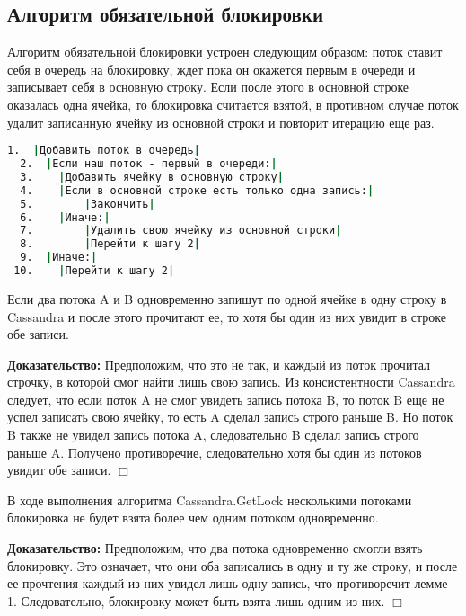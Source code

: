 \subsection{Алгоритм обязательной блокировки}

Алгоритм обязательной блокировки устроен следующим образом: поток ставит себя в очередь на блокировку, ждет пока он окажется первым в очереди и записывает себя в основную строку. Если после этого в основной строке оказалась одна ячейка, то блокировка считается взятой, в противном случае поток удалит записанную ячейку из основной строки и повторит итерацию еще раз.

\begin{lstlisting}[language=csh,caption={Алгоритм Cassandra.GetLock(lockId, threadId)}]
  1.  |Добавить поток в очередь|
  2.  |Если наш поток - первый в очереди:|
  3.  	|Добавить ячейку в основную строку|
  4.  	|Если в основной строке есть только одна запись:|
  5.  		|Закончить|
  6.  	|Иначе:|
  7.  		|Удалить свою ячейку из основной строки|
  8.  		|Перейти к шагу 2|
  9.  |Иначе:|
 10.  	|Перейти к шагу 2|

\end{lstlisting}

\begin{lemma}
Если два потока A и B одновременно запишут по одной ячейке в одну строку в Cassandra и после этого прочитают ее, то хотя бы один из них увидит в строке обе записи.
\end{lemma}
\textbf{Доказательство:}
Предположим, что это не так, и каждый из поток прочитал строчку, в которой смог найти лишь свою запись. Из консистентности Cassandra следует, что если поток A не смог увидеть запись потока B, то поток B еще не успел записать свою ячейку, то есть A сделал запись строго раньше B. Но поток B также не увидел запись потока A, следовательно B сделал запись строго раньше A. Получено противоречие, следовательно хотя бы один из потоков увидит обе записи.
$\Box$

\begin{theorem}
В ходе выполнения алгоритма Cassandra.GetLock несколькими потоками блокировка не будет взята более чем одним потоком одновременно.
\end{theorem}
\textbf{Доказательство:}
Предположим, что два потока одновременно смогли взять блокировку. Это означает, что они оба записались в одну и ту же строку, и после ее прочтения каждый из них увидел лишь одну запись, что противоречит лемме 1. Следовательно, блокировку может быть взята лишь одним из них.
$\Box$

